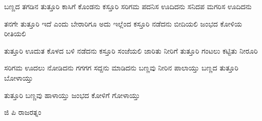 \documentclass{article}
\begin{document}
\Large


\begin{poem}
  \centering
  \begin{stanza}
    \centering
    ಬಣ್ಣದ ತಗಡಿನ ತುತ್ತೂರಿ \verseline
    ಕಾಸಿಗೆ ಕೊಂಡನು ಕಸ್ತೂರಿ \verseline
    ಸರಿಗಮ ಪದನಿಸ ಊದಿದನು \verseline
    ಸನಿದಪ ಮಗರಿಸ ಊದಿದನು
  \end{stanza}
  \begin{stanza}
    ತನಗೇ ತುತ್ತೂರಿ ಇದೆ ಎಂದು \verseline
    ಬೇರಾರಿಗೂ ಅದು ಇಲ್ಲೆಂದ \verseline
    ಕಸ್ತೂರಿ ನಡೆದನು ಬೀದಿಯಲಿ \verseline
    ಜಂಭದ ಕೋಳಿಯ ರೀತಿಯಲಿ
  \end{stanza}
  \begin{stanza}
    ತುತ್ತೂರಿ ಊದುತ ಕೊಳದ ಬಳಿ \verseline
    ನಡೆದನು ಕಸ್ತೂರಿ ಸಂಜೆಯಲಿ \verseline
    ಜಾರಿತು ನೀರಿಗೆ ತುತ್ತೂರಿ \verseline
    ಗಂಟಲು ಕಟ್ಟಿತು ನೀರೂರಿ
  \end{stanza}
  \begin{stanza}
    ಸರಿಗಮ ಊದಲು ನೋಡಿದನು \verseline
    ಗಗಗಗ ಸದ್ದನು ಮಾಡಿದನು \verseline
    ಬಣ್ಣವು ನೀರಿನ ಪಾಲಾಯ್ತು \verseline
    ಬಣ್ಣದ ತುತ್ತೂರಿ ಬೋಳಾಯ್ತು
  \end{stanza}
  \begin{stanza}
    ತುತ್ತೂರಿ ಬಣ್ಣವು ಹಾಳಾಯ್ತು \verseline
    ಜಂಭದ ಕೋಳಿಗೆ ಗೋಳಾಯ್ತು
  \end{stanza}
\end{poem}
\raggedleft
ಜಿ ಪಿ ರಾಜರತ್ನಂ
\end{document}
